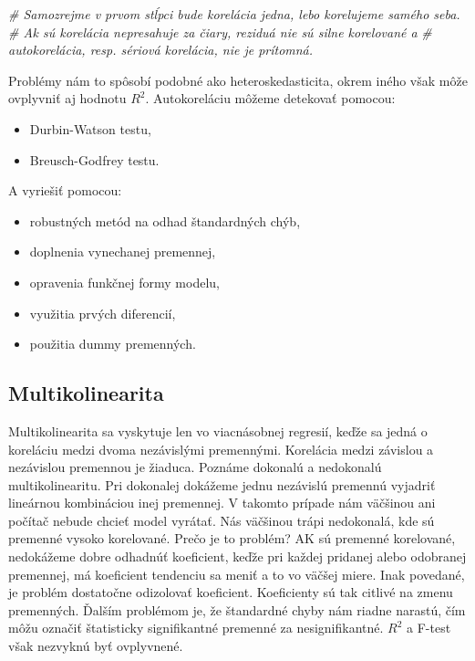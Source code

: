 \documentclass[]{article}
\newenvironment{Shaded}{\begin{snugshade}}{\end{snugshade}}
\newcommand{\CommentTok}[1]{\textcolor[rgb]{0.56,0.35,0.01}{\textit{#1}}}
\providecommand{\tightlist}{%
  \setlength{\itemsep}{0pt}\setlength{\parskip}{0pt}}
\begin{document}
\begin{Shaded}
\begin{Highlighting}[]
\CommentTok{# Samozrejme v prvom stĺpci bude korelácia jedna, lebo korelujeme samého seba.}
\CommentTok{# Ak sú korelácia nepresahuje za čiary, reziduá nie sú silne korelované a }
\CommentTok{# autokorelácia, resp. sériová korelácia, nie je prítomná.}
\end{Highlighting}
\end{Shaded}

Problémy nám to spôsobí podobné ako heteroskedasticita, okrem iného však
môže ovplyvniť aj hodnotu \(R^2\). Autokoreláciu môžeme detekovať
pomocou:

\begin{itemize}
\tightlist
\item
  Durbin-Watson testu,
\item
  Breusch-Godfrey testu.
\end{itemize}

A vyriešiť pomocou:

\begin{itemize}
\tightlist
\item
  robustných metód na odhad štandardných chýb,
\item
  doplnenia vynechanej premennej,
\item
  opravenia funkčnej formy modelu,
\item
  využitia prvých diferencií,
\item
  použitia dummy premenných.
\end{itemize}

\hypertarget{multikolinearita}{%
\subsection{Multikolinearita}\label{multikolinearita}}

Multikolinearita sa vyskytuje len vo viacnásobnej regresií, keďže sa
jedná o koreláciu medzi dvoma nezávislými premennými. Korelácia medzi
závislou a nezávislou premennou je žiaduca. Poznáme dokonalú a
nedokonalú multikolinearitu. Pri dokonalej dokážeme jednu nezávislú
premennú vyjadriť lineárnou kombináciou inej premennej. V takomto
prípade nám väčšinou ani počítač nebude chcieť model vyrátať. Nás
väčšinou trápi nedokonalá, kde sú premenné vysoko korelované. Prečo je
to problém? AK sú premenné korelované, nedokážeme dobre odhadnúť
koeficient, keďže pri každej pridanej alebo odobranej premennej, má
koeficient tendenciu sa meniť a to vo väčšej miere. Inak povedané, je
problém dostatočne odizolovať koeficient. Koeficienty sú tak citlivé na
zmenu premenných. Ďalším problémom je, že štandardné chyby nám riadne
narastú, čím môžu označiť štatisticky signifikantné premenné za
nesignifikantné. \(R^2\) a F-test však nezvyknú byť ovplyvnené.
\end{document}
